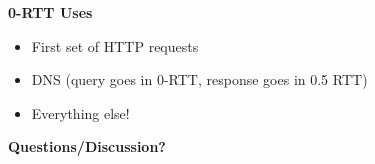 \documentclass[helvetica]{seminar}
\newcommand{\heading}[1]{%
  \begin{center} 
    \large\bf 
    #1 
  \end{center} 
  \vspace{.4 in}}
\begin{document}
\begin{slide}
\heading{0-RTT Uses}

\vspace{-2ex}

\begin{itemize}
\item First set of HTTP requests
\item DNS (query goes in 0-RTT, response goes in 0.5 RTT)
\item Everything else!
\end{itemize}


\end{slide}

\centerslidestrue

\begin{slide}
\heading{Questions/Discussion?}

\end{slide}
\end{document}
